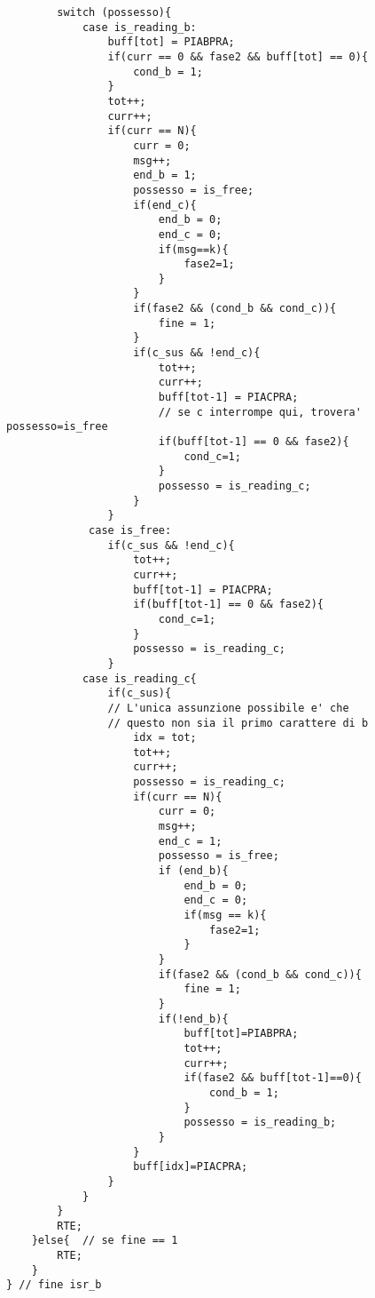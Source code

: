 \documentclass{article}
\begin{document}
\begin{lstlisting}
        switch (possesso){
            case is_reading_b:
                buff[tot] = PIABPRA;
                if(curr == 0 && fase2 && buff[tot] == 0){
                    cond_b = 1;
                }
                tot++;
                curr++;
                if(curr == N){
                    curr = 0;
                    msg++;
                    end_b = 1;
                    possesso = is_free;
                    if(end_c){
                        end_b = 0;
                        end_c = 0;
                        if(msg==k){
                            fase2=1;
                        }
                    }
                    if(fase2 && (cond_b && cond_c)){
                        fine = 1;
                    }
                    if(c_sus && !end_c){
                        tot++;
                        curr++;
                        buff[tot-1] = PIACPRA;
                        // se c interrompe qui, trovera' possesso=is_free
                        if(buff[tot-1] == 0 && fase2){
                            cond_c=1;
                        }
                        possesso = is_reading_c;
                    }
                }
             case is_free:
                if(c_sus && !end_c){
                    tot++;
                    curr++;
                    buff[tot-1] = PIACPRA;
                    if(buff[tot-1] == 0 && fase2){
                        cond_c=1;
                    }
                    possesso = is_reading_c;
                }
            case is_reading_c{
                if(c_sus){
                // L'unica assunzione possibile e' che 
                // questo non sia il primo carattere di b
                    idx = tot;
                    tot++;
                    curr++;
                    possesso = is_reading_c;
                    if(curr == N){
                        curr = 0;
                        msg++;
                        end_c = 1;
                        possesso = is_free;
                        if (end_b){
                            end_b = 0;
                            end_c = 0;
                            if(msg == k){
                                fase2=1;
                            }
                        }
                        if(fase2 && (cond_b && cond_c)){
                            fine = 1;
                        }
                        if(!end_b){
                            buff[tot]=PIABPRA;
                            tot++;
                            curr++;
                            if(fase2 && buff[tot-1]==0){
                                cond_b = 1;
                            }
                            possesso = is_reading_b;
                        }
                    }
                    buff[idx]=PIACPRA;
                }
            }
        }   
        RTE;
    }else{  // se fine == 1
        RTE;
    }
} // fine isr_b 
\end{lstlisting}
\newpage
\end{document}
